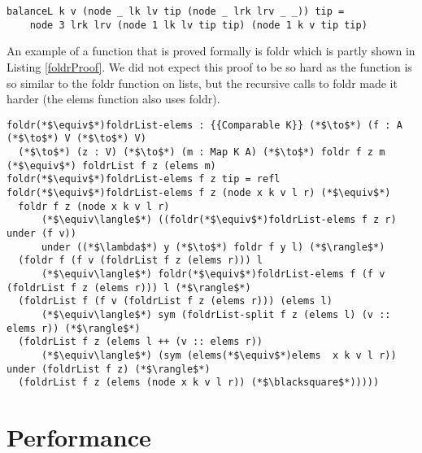 \documentclass[a4paper,UKenglish,cleveref, autoref, thm-restate]{template/lipics-v2021}
\begin{document}
\begin{lstlisting}[label=balanceL,caption=balanceL assumes that the size of a node is 3 when the right branch is a tip.]
balanceL k v (node _ lk lv tip (node _ lrk lrv _ _)) tip = 
    node 3 lrk lrv (node 1 lk lv tip tip) (node 1 k v tip tip)
\end{lstlisting}

An example of a function that is proved formally is foldr which is partly shown in Listing \ref{foldrProof}. We did not expect this proof to be so hard as the function is so similar to the foldr function on lists, but the recursive calls to foldr made it harder (the elems function also uses foldr).

\begin{lstlisting}[label=foldrProof,caption=The following equality is proved foldr f z $\equiv$ foldr f z . elems]    
foldr(*$\equiv$*)foldrList-elems : {{Comparable K}} (*$\to$*) (f : A (*$\to$*) V (*$\to$*) V) 
  (*$\to$*) (z : V) (*$\to$*) (m : Map K A) (*$\to$*) foldr f z m (*$\equiv$*) foldrList f z (elems m)
foldr(*$\equiv$*)foldrList-elems f z tip = refl
foldr(*$\equiv$*)foldrList-elems f z (node x k v l r) (*$\equiv$*) 
  foldr f z (node x k v l r) 
      (*$\equiv\langle$*) ((foldr(*$\equiv$*)foldrList-elems f z r) under (f v)) 
      under ((*$\lambda$*) y (*$\to$*) foldr f y l) (*$\rangle$*)
  (foldr f (f v (foldrList f z (elems r))) l 
      (*$\equiv\langle$*) foldr(*$\equiv$*)foldrList-elems f (f v (foldrList f z (elems r))) l (*$\rangle$*)
  (foldrList f (f v (foldrList f z (elems r))) (elems l) 
      (*$\equiv\langle$*) sym (foldrList-split f z (elems l) (v :: elems r)) (*$\rangle$*)
  (foldrList f z (elems l ++ (v :: elems r)) 
      (*$\equiv\langle$*) (sym (elems(*$\equiv$*)elems  x k v l r)) under (foldrList f z) (*$\rangle$*)
  (foldrList f z (elems (node x k v l r)) (*$\blacksquare$*))))) 
\end{lstlisting}

\section*{Performance}
\end{document}
